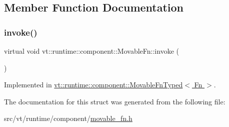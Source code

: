 \subsection{Member Function Documentation}
\mbox{\label{structvt_1_1runtime_1_1component_1_1_movable_fn_a3dc1fa79ff75471bcee31b5b25bd0d2a}} 
\subsubsection{\texorpdfstring{invoke()}{invoke()}}
{\footnotesize\ttfamily virtual void vt\+::runtime\+::component\+::\+Movable\+Fn\+::invoke (\begin{DoxyParamCaption}{ }\end{DoxyParamCaption})\hspace{0.3cm}{\ttfamily [pure virtual]}}



Implemented in \hyperlink{structvt_1_1runtime_1_1component_1_1_movable_fn_typed_a3b858f98fdfd58d9a812fa23138fd513}{vt\+::runtime\+::component\+::\+Movable\+Fn\+Typed$<$ Fn $>$}.



The documentation for this struct was generated from the following file\+:\begin{DoxyCompactItemize}
\item 
src/vt/runtime/component/\hyperlink{movable__fn_8h}{movable\+\_\+fn.\+h}\end{DoxyCompactItemize}
